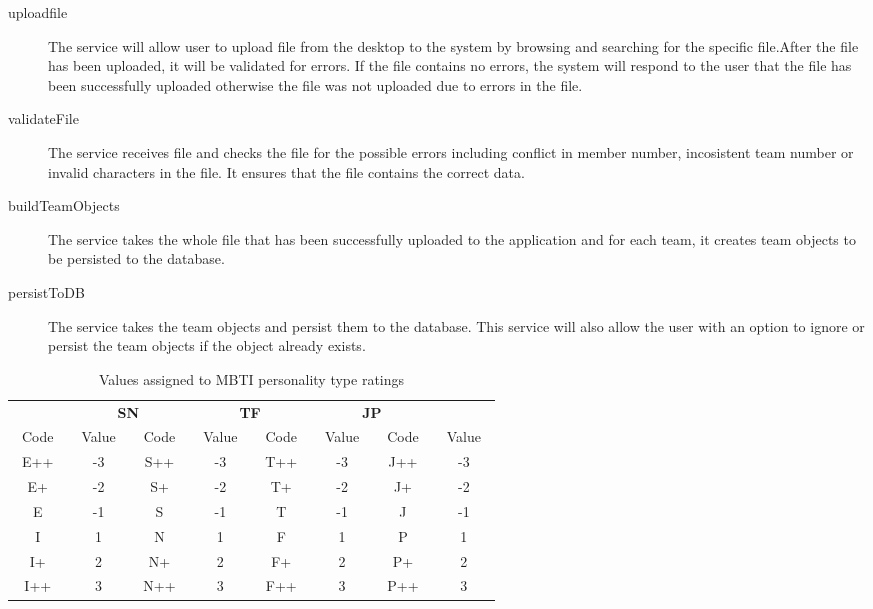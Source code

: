 

\begin{description}
\item[uploadfile] The service will allow user to upload file from the desktop to the system  by browsing and searching for the specific file.After the file has been uploaded, it will be validated for errors. If the file contains no errors, the system will respond to the user that the file has been successfully uploaded otherwise the file was not uploaded due to errors in the file.


\item[validateFile] The service receives file and checks the file for the possible errors including conflict in member number, incosistent team number or invalid characters in the file. It ensures that the file contains the correct data.

\item[buildTeamObjects] The service takes the whole file that has been successfully uploaded to the application and for each team, it creates team objects to be persisted to the database. 

\item[persistToDB] The service takes the team objects and persist them to the database. This service will also allow the user with an option to ignore or persist the team objects if the object already exists. 

\end{description}  



\begin{table}[h]
\centering
\caption{Values assigned to MBTI personality type ratings \label{tab:mbti_ratings}}
\begin{tabular}{cc|cc|cc|cc}

\hline
\noalign{\smallskip}
\multicolumn{2}{c}{\textbf{IE}}  & \multicolumn{2}{c}{\textbf{SN}} & \multicolumn{2}{c}{\textbf{TF}} & \multicolumn{2}{c}{\textbf{JP}} \\
~Code~ & ~Value~ & ~Code~ & ~Value~ & ~Code~ & ~Value~ & ~Code~ & ~Value~\\
\noalign{\smallskip}
\hline
E++ & -3  & S++ & -3 & T++ & -3 & J++ & -3\\
E+ & -2 & S+ & -2 & T+ & -2 & J+ & -2  \\
E & -1 & S & -1 & T & -1 & J & -1  \\
I & 1 & N & 1 & F & 1 & P & 1 \\
I+ & 2  & N+ & 2 & F+ & 2 & P+ & 2 \\
I++ & 3 & N++  & 3 & F++  & 3 & P++  & 3 \\
\hline
\end{tabular}
\end{table}






